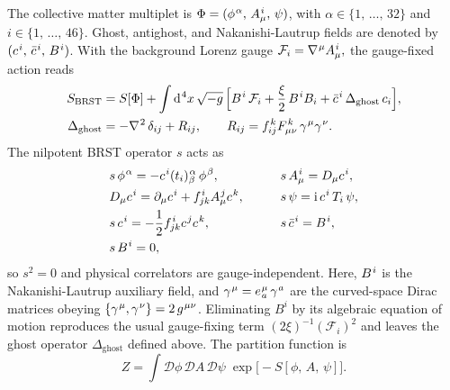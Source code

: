 \documentclass[pdflatex,sn-mathphys-num]{sn-jnl}
\theoremstyle{thmstyleone}
\theoremstyle{thmstyletwo}%
\theoremstyle{thmstylethree}%
\newcommand{\sm}{\hspace{.065em}}
\newcommand{\smexp}[1]{^{\sm #1}}
\newcommand{\dv}[1]{\mathrm{d}\smexp{#1}}
\begin{document}
The collective matter multiplet is
\(
  \Phi=(\phi\smexp{\alpha},\,A_{\mu}\smexp{i},\,\psi)
\),
with
\(
  \alpha\in \{1,\,\dots,\,32\}
\)
and
\(
  i\in\{1,\,\dots,\,46\}
\).
Ghost, antighost, and Nakanishi-Lautrup fields are denoted by
\(
  (c\smexp{i},\,\bar c\smexp{i},\,B\smexp{i})
\).
With the background Lorenz gauge
\(
  \mathcal F_{i}=\nabla\smexp{\mu}A\smexp{i}_{\mu},
\)
the gauge-fixed action reads
\begin{equation}\label{eq:BRSTaction}
\begin{aligned}
  S_{\text{BRST}}
  &= S[\Phi]
     +\int \dv{4}x\,\sqrt{-g}\,\Bigl[
        B\smexp{i}\,\mathcal F_{i}
        +\frac{\xi}{2}\,B\smexp{i}B_{i}
        +\bar c\smexp{i}\,\Delta_{\text{ghost}}\,c_{i}\Bigr],\\
  \Delta_{\text{ghost}}
  &= -\nabla\smexp{2}\,\delta_{ij}
     +R_{ij},\qquad
     R_{ij}=f_{ij}\smexp{k}F\smexp{k}_{\mu\nu}\,
             \gamma\smexp{\mu}\gamma\smexp{\nu}.
\end{aligned}
\end{equation}
The nilpotent BRST operator \(s\) acts as
\[
\begin{aligned}
  &s\,\phi\smexp{\alpha}= -c\smexp{i}(t_{i})\smexp{\alpha}_{\beta}\,\phi\smexp{\beta},\qquad
  &&s\,A_{\mu}\smexp{i}= D_{\mu}c\smexp{i},\\
    &D_{\mu}c\smexp{i}= \partial_{\mu}c\smexp{i}+f\smexp{i}_{jk}A_{\mu}\smexp{j}c\smexp{k},\qquad
  &&s\,\psi= \mathrm i\,c\smexp{i}\,T_{i}\,\psi,\\
  &s\,c\smexp{i}= -\frac12 f\smexp{i}_{jk}c\smexp{j}c\smexp{k},\qquad
  &&s\,\bar c\smexp{i}= B\smexp{i},\\
  &s\,B\smexp{i}=0,
\end{aligned}
\]
so \(s^{2}=0\) and physical correlators are gauge-independent. Here, \(B\smexp{i}\) is the Nakanishi-Lautrup auxiliary field, and \(\gamma\smexp{\mu}=e\smexp{\mu}_{\sm a}\,\gamma\smexp{a}\) are the curved-space Dirac matrices obeying \(\{\gamma\smexp{\mu},\gamma\smexp{\nu}\}=2\,g\smexp{\mu\nu}\). Eliminating \(B^{i}\) by its algebraic
equation of motion reproduces the usual gauge-fixing term
\(
  (2\xi)^{-1}(\mathcal F_{i})^{2}
\)
and leaves the ghost operator \(\Delta_{\text{ghost}}\) defined above.
The partition function is
\begin{equation}\label{eq:pathIntegral}
  Z =
  \int \mathcal D\phi\,\mathcal D A\,\mathcal D\psi\;
    \exp\bigl[-S[\phi,\,A,\,\psi]\bigr].
\end{equation}
\end{document}
